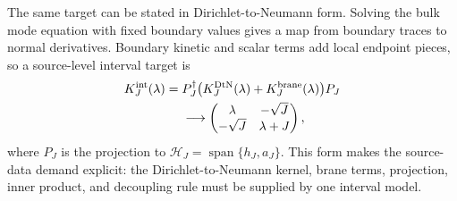 The same target can be stated in Dirichlet-to-Neumann form.  Solving the bulk
mode equation with fixed boundary values gives a map from boundary traces to
normal derivatives.  Boundary kinetic and scalar terms add local endpoint
pieces, so a source-level interval target is
\begin{equation}
  \begin{aligned}
  K^{\rm int}_J(\lambda)
  ={}&
  P_J^\dagger
  \big(K^{\rm DtN}_J(\lambda)+K^{\rm brane}_J(\lambda)\big)P_J
  \\
  &\longrightarrow
  \begin{pmatrix}
  \lambda&-\sqrt J\\
  -\sqrt J&\lambda+J
  \end{pmatrix},
  \end{aligned}
  \label{eq:interval-dtn-target}
\end{equation}
where \(P_J\) is the projection to
\(\mathcal H_J=\operatorname{span}\{h_J,a_J\}\).  This form makes the
source-data demand explicit: the Dirichlet-to-Neumann kernel, brane terms,
projection, inner product, and decoupling rule must be supplied by one
interval model.

